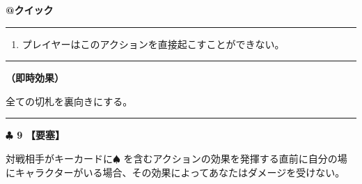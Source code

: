 \documentclass[twocolumn,a5paper,papersize,10pt]{jarticle}
\begin{document}
\vspace{-1zh}

 
\begin{tcolorbox}[title={\small\bf【Action】切札リセット}{\scriptsize （誘発）}]

{\scriptsize\bf @クイック }

\vspace{1mm} %
\hrule height 0.1mm depth 0mm width 62mm %
\vspace{1mm} %


\vspace{-1zh}%
\begin{enumerate}
\renewcommand{\labelenumi}{※}
\setlength{\leftskip}{-0.3cm}
\setlength{\itemsep}{0pt} %
\setlength{\parskip}{0pt} %

\item プレイヤーはこのアクションを直接起こすことができない。

\vspace{-3mm}%
\end{enumerate}
\vspace{-2mm} %
\vspace{1zh}%
\vspace{1mm} %
\hrule height 0.1mm depth 0mm width 62mm %
\vspace{1mm} %

{\bf（即時効果）}

全ての切札を裏向きにする。

\vspace{1mm} %
\end{tcolorbox}

\vspace{-1zh}

 
 

\vspace{3mm} %
\hrule height 0.5mm depth 0mm width 66.5mm %
\vspace{1mm} %
{\Large\bf $\clubsuit$ 9} {\normalsize\bf【要塞】} %
\vspace{1mm} %

対戦相手がキーカードに{\normalsize $\spadesuit$} を含むアクションの効果を発揮する直前に自分の場にキャラクターがいる場合、その効果によってあなたはダメージを受けない。

 
 
\end{document}
